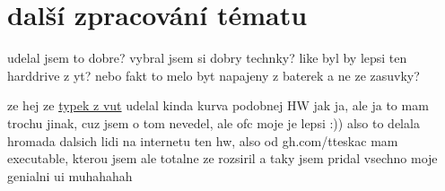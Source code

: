 \documentclass{template/socthesis}
\begin{document}
\section{další zpracování tématu}
udelal jsem to dobre? vybral jsem si dobry technky?
like byl by lepsi ten harddrive z yt?
nebo fakt to melo byt napajeny z baterek a ne ze zasuvky?

ze hej ze \href{https://dspace.vutbr.cz/bitstream/handle/11012/38621/final-thesis.pdf?sequence=-1}{typek z vut} udelal kinda kurva podobnej HW jak ja, ale ja to mam trochu jinak, cuz jsem o tom nevedel, ale ofc moje je lepsi :))
also to delala hromada dalsich lidi na internetu ten hw, also od gh.com/tteskac mam executable, kterou jsem ale totalne ze rozsiril a taky jsem pridal vsechno moje genialni ui muhahahah

\end{document}
